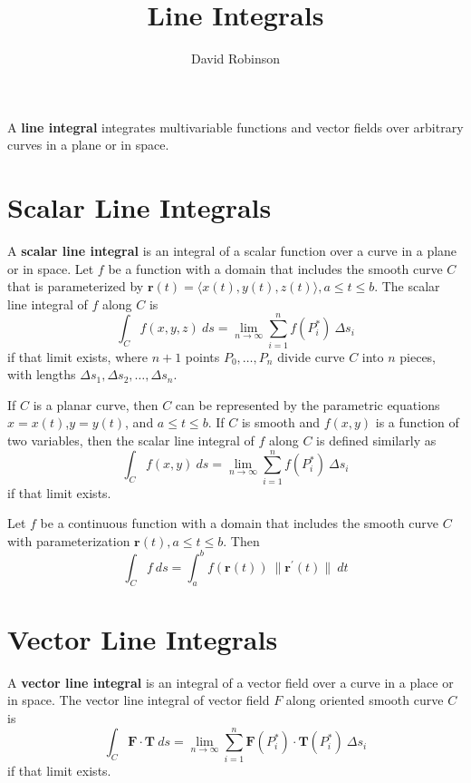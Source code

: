 \documentclass{article}
\title{Line Integrals}
\author{David Robinson}
\date{}
\begin{document}
\maketitle

A \textbf{line integral} integrates multivariable functions and vector fields over arbitrary curves in a plane or in space.

\section*{Scalar Line Integrals}

A \textbf{scalar line integral} is an integral of a scalar function over a curve in a plane or in space. Let $f$ be a function with a domain that includes the smooth curve $C$ that is parameterized by $\mathbf{r}(t)=\langle x(t),y(t),z(t)\rangle,a\leq t\leq b$. The scalar line integral of $f$ along $C$ is
\[\int_C f(x,y,z)\: ds=\lim_{n\rightarrow\infty}\sum^n_{i=1}f(P_i^*)\:\Delta s_i\] if that limit exists, where $n+1$ points $P_0,\ldots,P_n$ divide curve $C$ into $n$ pieces, with lengths $\Delta s_1,\Delta s_2, \ldots, \Delta s_n$.
\vspace{1em}

If $C$ is a planar curve, then $C$ can be represented by the parametric equations $x=x(t)$,$y=y(t)$, and $a\leq t\leq b$. If $C$ is smooth and $f(x,y)$ is a function of two variables, then the scalar line integral of $f$ along $C$ is defined similarly as
\[\int_C f(x,y)\: ds=\lim_{n\rightarrow\infty}\sum^n_{i=1}f(P_i^*)\:\Delta s_i\] if that limit exists.
\vspace{1em}

Let $f$ be a continuous function with a domain that includes the smooth curve $C$ with parameterization $\mathbf{r}(t),a\leq t\leq b$. Then
\[\int_C f\: ds=\int_a^b f(\mathbf{r}(t))\:\|\mathbf{r}^\prime (t)\|\: dt\]

\section*{Vector Line Integrals}

A \textbf{vector line integral} is an integral of a vector field over a curve in a place or in space. The vector line integral of vector field $F$ along oriented smooth curve $C$ is
\[\int_C \mathbf{F}\cdot\mathbf{T}\: ds=\lim_{n\rightarrow\infty}\sum^n_{i=1}\mathbf{F}(P_i^*)\cdot\mathbf{T}(P_i^*)\:\Delta s_i\] if that limit exists.
\vspace{1em}
\end{document}
